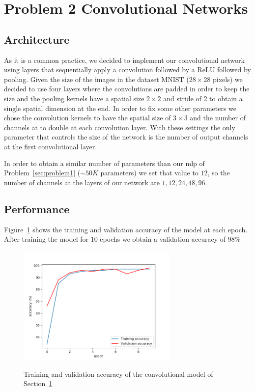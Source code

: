 \documentclass[a4paper]{article}
\begin{document}
\section{Problem 2 Convolutional Networks}
\label{sec:problem2}
\subsection{Architecture}
As it is a common practice, we decided to implement our convolutional network using layers that sequentially apply a convolution followed by a ReLU followed by pooling.
Given the size of the images in the dataset MNIST ($28\times28$ pixels) we decided to use four layers where the convolutions are padded in order to keep the size and the pooling kernels have a spatial size $2\times2$ and stride of 2 to obtain a single spatial dimension at the end. In order to fix some other parameters we chose the convolution kernels to have the spatial size of $3\times3$ and the number of channels at to double at each convolution layer. With these settings the only parameter that controls the size of the network is the number of output channels at the first convolutional layer. 

In order to obtain a similar number of parameters than our mlp of Problem~\ref{sec:problem1} ($\sim50K$ parameters) we set that value to $12$, so the number of channels at the layers of our network are  $1,12,24,48,96$. 
\subsection{Performance}
Figure~\ref{fig:CNN_accuracy} shows the training and validation accuracy of the model at each epoch. After training the model for 10 epochs we obtain a validation accuracy of $98\%$

\begin{figure}[h!]
\centering
\includegraphics[width=0.7\textwidth]{P2_CNN_accuracySGD}
\label{fig:CNN_accuracy}
\caption{Training and validation accuracy of the convolutional model of Section~\ref{sec:problem2}}
\end{figure}
\end{document}
